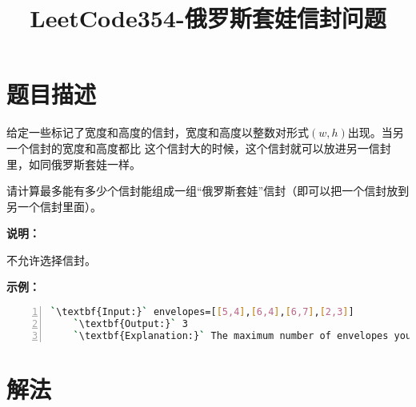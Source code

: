 \documentclass[a4paper]{article}
\title{LeetCode354-俄罗斯套娃信封问题}
\begin{document}
\maketitle

\section{题目描述}
给定一些标记了宽度和高度的信封，宽度和高度以整数对形式$(w,h)$出现。当另一个信封的宽度和高度都比
这个信封大的时候，这个信封就可以放进另一信封里，如同俄罗斯套娃一样。

请计算最多能有多少个信封能组成一组“俄罗斯套娃”信封（即可以把一个信封放到另一个信封里面）。

\noindent
\textbf{说明：}

不允许选择信封。

\noindent
\textbf{示例：}

\begin{lstlisting}[language=bash,numbers=left,numberstyle=\tiny\menlo,basicstyle=\small\menlo]
    `\textbf{Input:}` envelopes=[[5,4],[6,4],[6,7],[2,3]]
    `\textbf{Output:}` 3
    `\textbf{Explanation:}` The maximum number of envelopes you can Russian doll is 3 ([2,3] => [5,4] => [6,7]).
\end{lstlisting}



\section{解法}
\end{document}
